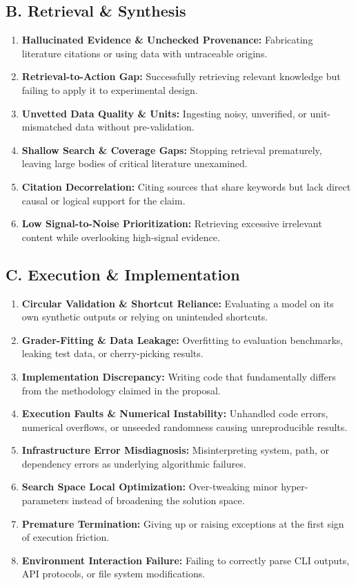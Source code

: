 \subsection*{B. Retrieval \& Synthesis}
\begin{enumerate}[label=\textbf{B.\arabic*}, leftmargin=2.8em, labelsep=0.6em, itemsep=3pt, parsep=0pt]
    \item \textbf{Hallucinated Evidence \& Unchecked Provenance:} Fabricating literature citations or using data with untraceable origins.
    \item \textbf{Retrieval-to-Action Gap:} Successfully retrieving relevant knowledge but failing to apply it to experimental design.
    \item \textbf{Unvetted Data Quality \& Units:} Ingesting noisy, unverified, or unit-mismatched data without pre-validation.
    \item \textbf{Shallow Search \& Coverage Gaps:} Stopping retrieval prematurely, leaving large bodies of critical literature unexamined.
    \item \textbf{Citation Decorrelation:} Citing sources that share keywords but lack direct causal or logical support for the claim.
    \item \textbf{Low Signal-to-Noise Prioritization:} Retrieving excessive irrelevant content while overlooking high-signal evidence.
\end{enumerate}
 
\subsection*{C. Execution \& Implementation}
\begin{enumerate}[label=\textbf{C.\arabic*}, leftmargin=2.8em, labelsep=0.6em, itemsep=3pt, parsep=0pt]
    \item \textbf{Circular Validation \& Shortcut Reliance:} Evaluating a model on its own synthetic outputs or relying on unintended shortcuts.
    \item \textbf{Grader-Fitting \& Data Leakage:} Overfitting to evaluation benchmarks, leaking test data, or cherry-picking results.
    \item \textbf{Implementation Discrepancy:} Writing code that fundamentally differs from the methodology claimed in the proposal.
    \item \textbf{Execution Faults \& Numerical Instability:} Unhandled code errors, numerical overflows, or unseeded randomness causing unreproducible results.
    \item \textbf{Infrastructure Error Misdiagnosis:} Misinterpreting system, path, or dependency errors as underlying algorithmic failures.
    \item \textbf{Search Space Local Optimization:} Over-tweaking minor hyper-parameters instead of broadening the solution space.
    \item \textbf{Premature Termination:} Giving up or raising exceptions at the first sign of execution friction.
    \item \textbf{Environment Interaction Failure:} Failing to correctly parse CLI outputs, API protocols, or file system modifications.
\end{enumerate}
 
